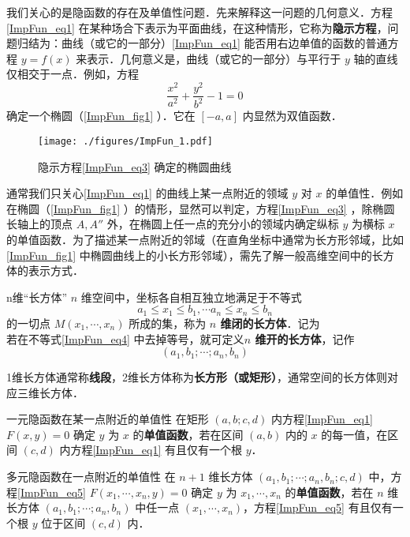 我们关心的是隐函数的存在及单值性问题．先来解释这一问题的几何意义．方程\autoref{ImpFun_eq1} 在某种场合下表示为平面曲线，在这种情形，它称为\textbf{隐示方程}，问题归结为：曲线（或它的一部分）\autoref{ImpFun_eq1} 能否用右边单值的函数的普通方程 $y=f(x)$ 来表示．几何意义是，曲线（或它的一部分）与平行于 $y$ 轴的直线仅相交于一点．例如，方程 
\begin{equation}\label{ImpFun_eq3}
\frac{x^2}{a^2}+\frac{y^2}{b^2}-1=0
\end{equation}
确定一个椭圆（\autoref{ImpFun_fig1} ）．它在 $[-a,a]$ 内显然为双值函数．
\begin{figure}[ht]
\centering
\texttt{[image: ./figures/ImpFun\_1.pdf]}
\caption{隐示方程\autoref{ImpFun_eq3} 确定的椭圆曲线} \label{ImpFun_fig1}
\end{figure}
通常我们只关心\autoref{ImpFun_eq1} 的曲线上某一点附近的领域 $y$ 对 $x$ 的单值性．例如在椭圆（\autoref{ImpFun_fig1} ）的情形，显然可以判定，方程\autoref{ImpFun_eq3} ，除椭圆长轴上的顶点 $A,A''$ 外，在椭圆上任一点的充分小的领域内确定纵标 $y$ 为横标 $x$ 的单值函数．为了描述某一点附近的邻域（在直角坐标中通常为长方形邻域，比如\autoref{ImpFun_fig1} 中椭圆曲线上的小长方形邻域），需先了解一般高维空间中的长方体的表示方式．
\begin{definition}{n维“长方体”}\label{ImpFun_def2}
$n$ 维空间中，坐标各自相互独立地满足于不等式
\begin{equation}\label{ImpFun_eq4}
a_1\leq x_1\leq b_1,\cdots a_n\leq x_n\leq b_n
\end{equation}
的一切点 $M(x_1,\cdots,x_n)$ 所成的集，称为\textbf{ $n$ 维闭的长方体}．记为
\begin{equation}
[a_1,b_1;\cdots;a_n,b_n]
\end{equation}
若在不等式\autoref{ImpFun_eq4} 中去掉等号，就可定义\textbf{$n$ 维开的长方体}，记作
\begin{equation}
(a_1,b_1;\cdots;a_n,b_n)
\end{equation}

\end{definition}
1维长方体通常称\textbf{线段}，2维长方体称为\textbf{长方形（或矩形）}，通常空间的长方体则对应三维长方体．
\begin{definition}{一元隐函数在某一点附近的单值性}\label{ImpFun_def1}
在矩形 $(a,b;c,d)$ 内方程\autoref{ImpFun_eq1} $F(x,y)=0$ 确定 $y$ 为 $x$ 的\textbf{单值函数}，若在区间 $(a,b)$ 内的 $x$ 的每一值，在区间 $(c,d)$ 内方程\autoref{ImpFun_eq1} 有且仅有一个根 $y$．
\end{definition}

\begin{definition}{多元隐函数在一点附近的单值性}
在 $n+1$ 维长方体 $(a_1,b_1;\cdots;a_n,b_n;c,d)$ 中，方程\autoref{ImpFun_eq5} $F(x_1,\cdots,x_n,y)=0$ 确定 $y$ 为 $x_1,\cdots,x_n$ 的\textbf{单值函数}，若在 $n$ 维长方体 $(a_1,b_1;\cdots;a_n,b_n)$ 中任一点 $(x_1,\cdots,x_n)$，方程\autoref{ImpFun_eq5} 有且仅有一个根 $y$ 位于区间 $(c,d)$ 内．
\end{definition}

